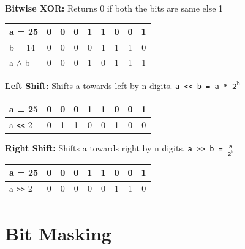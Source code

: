 \vspace{3ex}
\textbf{\large{Bitwise XOR}: }
Returns 0 if both the bits are same else 1

\begin{tabularx}{9cm}{|P{1.5cm}|C|C|C|C|C|C|C|C|}\hline
   a = 25 &
   0 & 0 & 0 & 1 & 1 & 0 & 0 & 1\\\hline
   b = 14 &
   0 & 0 & 0 & 0 & 1 & 1 & 1 & 0\\\hline
   a $\wedge$ b &
   0 & 0 & 0 & 1 & 0 & 1 & 1 & 1\\\hline
\end{tabularx}

\vspace{3ex}
\textbf{\large{Left Shift}: }
Shifts a towards left by n digits.
\texttt{a << b = a * $\texttt{2}^\texttt{b}$}

\begin{tabularx}{9cm}{|P{1.5cm}|C|C|C|C|C|C|C|C|}\hline
   a = 25 &
   0 & 0 & 0 & 1 & 1 & 0 & 0 & 1\\\hline
   a \texttt{<<} 2 &
   0 & 1 & 1 & 0 & 0 & 1 & 
   0 & 0\\\hline
\end{tabularx}

\vspace{3ex}
\textbf{\large{Right Shift}: }
Shifts a towards right by n digits.
\texttt{a >> b = $\frac{\texttt{a}}{\texttt{2}^\texttt{b}}$}

\begin{tabularx}{9cm}{|P{1.5cm}|C|C|C|C|C|C|C|C|}\hline
   a = 25 &
   0 & 0 & 0 & 1 & 1 & 0 & 0 & 1\\\hline
   a \texttt{>>} 2 &
   0 & 0 &
   0 & 0 & 0 & 1 & 1 & 0\\\hline
\end{tabularx}

\vspace{2ex}
\section{Bit Masking}


